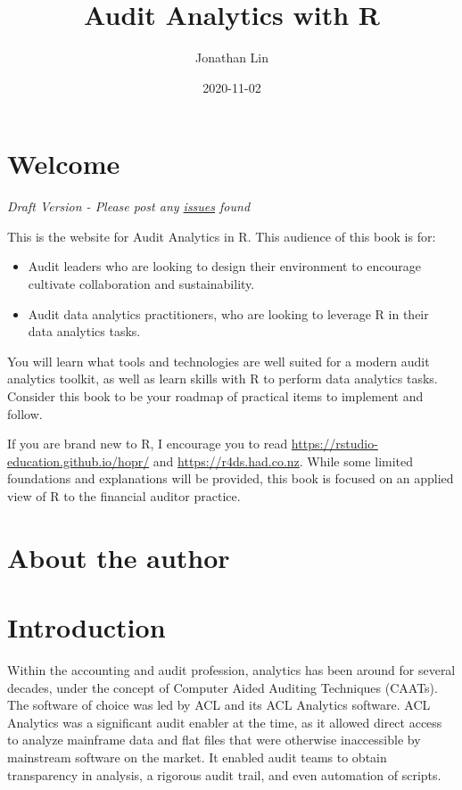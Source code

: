 \documentclass[
]{book}
\title{Audit Analytics with R}
\author{Jonathan Lin}
\date{2020-11-02}
\providecommand{\tightlist}{%
  \setlength{\itemsep}{0pt}\setlength{\parskip}{0pt}}
\begin{document}
\maketitle

{
\setcounter{tocdepth}{1}
\tableofcontents
}
\hypertarget{welcome}{%
\chapter*{Welcome}\label{welcome}}

\emph{Draft Version - Please post any \href{https://github.com/jonlinca/auditanalytics/issues}{issues} found}

This is the website for Audit Analytics in R. This audience of this book is for:

\begin{itemize}
\tightlist
\item
  Audit leaders who are looking to design their environment to encourage cultivate collaboration and sustainability.
\item
  Audit data analytics practitioners, who are looking to leverage R in their data analytics tasks.
\end{itemize}

You will learn what tools and technologies are well suited for a modern audit analytics toolkit, as well as learn skills with R to perform data analytics tasks. Consider this book to be your roadmap of practical items to implement and follow.

If you are brand new to R, I encourage you to read \url{https://rstudio-education.github.io/hopr/} and \url{https://r4ds.had.co.nz}. While some limited foundations and explanations will be provided, this book is focused on an applied view of R to the financial auditor practice.

\hypertarget{about-the-author}{%
\chapter*{About the author}\label{about-the-author}}

\hypertarget{intro}{%
\chapter{Introduction}\label{intro}}

Within the accounting and audit profession, analytics has been around for several decades, under the concept of Computer Aided Auditing Techniques (CAATs). The software of choice was led by ACL and its ACL Analytics software. ACL Analytics was a significant audit enabler at the time, as it allowed direct access to analyze mainframe data and flat files that were otherwise inaccessible by mainstream software on the market. It enabled audit teams to obtain transparency in analysis, a rigorous audit trail, and even automation of scripts.
\end{document}
